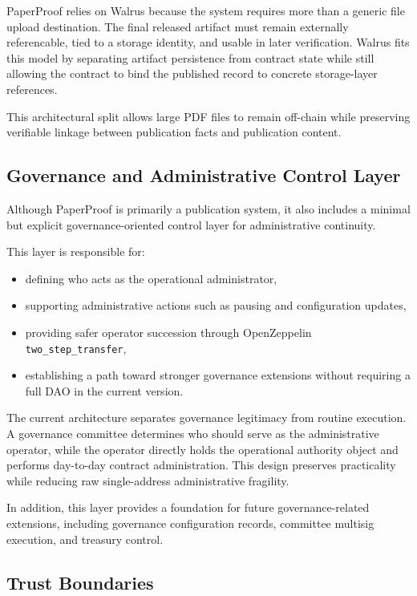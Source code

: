 \documentclass[journal]{IEEEtran}
\begin{document}
PaperProof relies on Walrus because the system requires more than a generic file upload destination. The final released artifact must remain externally referencable, tied to a storage identity, and usable in later verification. Walrus fits this model by separating artifact persistence from contract state while still allowing the contract to bind the published record to concrete storage-layer references.

This architectural split allows large PDF files to remain off-chain while preserving verifiable linkage between publication facts and publication content.

\subsection{Governance and Administrative Control Layer}

Although PaperProof is primarily a publication system, it also includes a minimal but explicit governance-oriented control layer for administrative continuity.

This layer is responsible for:
\begin{itemize}
    \item defining who acts as the operational administrator,
    \item supporting administrative actions such as pausing and configuration updates,
    \item providing safer operator succession through OpenZeppelin \texttt{two\_step\_transfer},
    \item establishing a path toward stronger governance extensions without requiring a full DAO in the current version.
\end{itemize}


The current architecture separates governance legitimacy from routine execution. A governance committee determines who should serve as the administrative operator, while the operator directly holds the operational authority object and performs day-to-day contract administration. This design preserves practicality while reducing raw single-address administrative fragility.

In addition, this layer provides a foundation for future governance-related extensions, including governance configuration records, committee multisig execution, and treasury control.

\subsection{Trust Boundaries}
\end{document}
